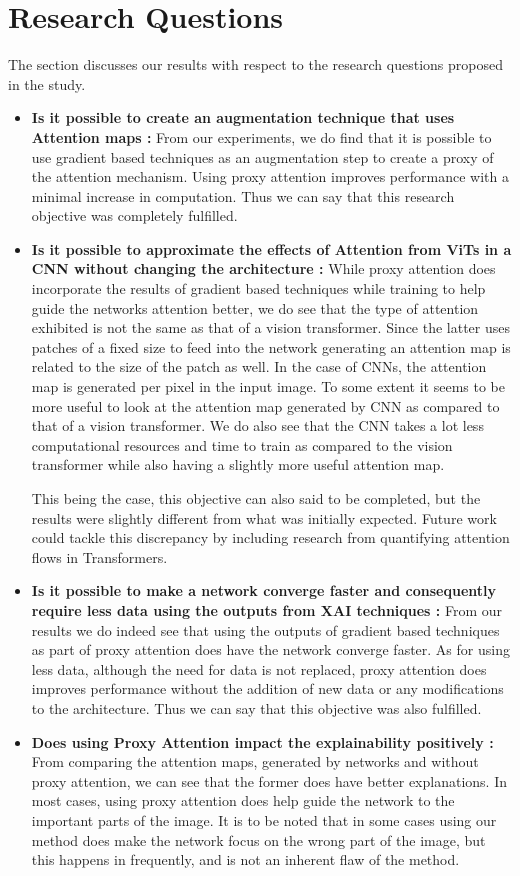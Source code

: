 \documentclass[a4paper,11pt,openright]{book}
\begin{document}
\section{Research Questions}

 
The section discusses our results with respect to the research questions proposed in the study.
\begin{itemize}
\item \textbf{Is it possible to create an augmentation technique that uses Attention maps :} From our experiments, we do find that it is possible to use gradient based techniques as an augmentation step to create a proxy of the attention mechanism. Using proxy attention improves performance with a minimal increase in computation. Thus we can say that this research objective was completely fulfilled.
\item \textbf{Is it possible to approximate the effects of Attention from ViTs in a CNN without changing the architecture :} While proxy attention does incorporate the results of gradient based techniques while training to help guide the networks attention better, we do see that the type of attention exhibited is not the same as that of a vision transformer. Since the latter uses patches of a fixed size to feed into the network generating an attention map is related to the size of the patch as well. In the case of CNNs, the attention map is generated per pixel in the input image. To some extent it seems to be more useful to look at the attention map generated by CNN as compared to that of a vision transformer. We do also see that the CNN takes a lot less computational resources and time to train as compared to the vision transformer while also having a slightly more useful attention map. 

This being the case, this objective can also said to be completed, but the results were slightly different from what was initially expected. Future work could tackle this discrepancy by including research from quantifying attention flows in Transformers. \cite{abnarQuantifyingAttentionFlow2020}
\item \textbf{Is it possible to make a network converge faster and consequently require less data using the outputs from XAI techniques :} From our results we do indeed see that using the outputs of gradient based techniques as part of proxy attention does have the network converge faster. As for using less data, although the need for data is not replaced, proxy attention does improves performance without the addition of new data or any modifications to the architecture. Thus we can say that this objective was also fulfilled.
\item \textbf{Does using Proxy Attention impact the explainability positively :} From comparing the attention maps, generated by networks and without proxy attention, we can see that the former does have better explanations. In most cases, using proxy attention does help guide the network to the important parts of the image. It is to be noted that in some cases using our method does make the network focus on the wrong part of the image, but this happens in frequently, and is not an inherent flaw of the method.


\end{itemize}
\end{document}
